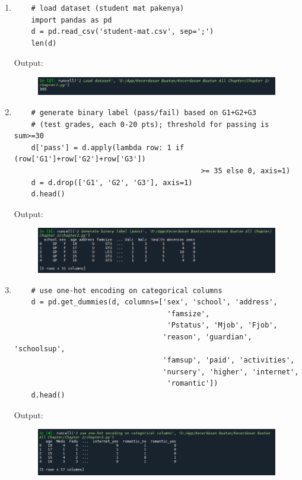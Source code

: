 \begin{enumerate}

\item
\begin{verbatim}
	# load dataset (student mat pakenya)
	import pandas as pd
	d = pd.read_csv('student-mat.csv', sep=';')
	len(d)
\end{verbatim}
\newline Output: 
\begin{figure}[!htbp]
	\centering
	\includegraphics[scale=0.5]{figures/chapter2/1.PNG}
\end{figure}

\item
\begin{verbatim}
	# generate binary label (pass/fail) based on G1+G2+G3 
	# (test grades, each 0-20 pts); threshold for passing is sum>=30
	d['pass'] = d.apply(lambda row: 1 if (row['G1']+row['G2']+row['G3']) 
											>= 35 else 0, axis=1)
	d = d.drop(['G1', 'G2', 'G3'], axis=1)
	d.head()
\end{verbatim}
\newline Output: 
\begin{figure}[!htbp]
	\centering
	\includegraphics[scale=0.5]{figures/chapter2/2.PNG}
\end{figure}

\item
\begin{verbatim}
	# use one-hot encoding on categorical columns
	d = pd.get_dummies(d, columns=['sex', 'school', 'address', 
									'famsize', 
									'Pstatus', 'Mjob', 'Fjob', 
	                               'reason', 'guardian', 'schoolsup', 
								   'famsup', 'paid', 'activities',
	                               'nursery', 'higher', 'internet', 
									'romantic'])
	d.head()
\end{verbatim}
\newline Output: 
\begin{figure}[!htbp]
	\centering
	\includegraphics[scale=0.5]{figures/chapter2/3.PNG}
\end{figure}


\end{enumerate}
